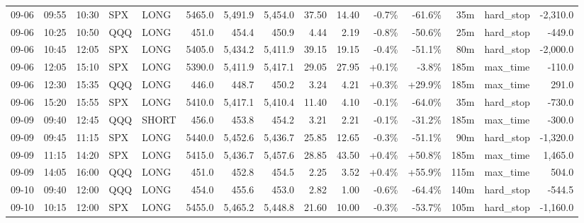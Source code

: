 \documentclass[11pt,a4paper,twoside]{article}
\begin{document}
\begin{landscape}
\begin{center}
\begin{longtable}{>{\color{txtmain}}l l l l l r r r r r r r r >{\color{txtmain}}l r}
09-06 & 09:55 & 10:30 & SPX & LONG & 5465.0 & 5,491.9 & 5,454.0 & 37.50 & 14.40 & \textcolor{lossred}{-0.7\%} & \textcolor{lossred}{-61.6\%} & 35m & hard\_stop & \textcolor{lossred}{-2,310.0} \\
09-06 & 10:25 & 10:50 & QQQ & LONG & 451.0 & 454.4 & 450.9 & 4.44 & 2.19 & \textcolor{lossred}{-0.8\%} & \textcolor{lossred}{-50.6\%} & 25m & hard\_stop & \textcolor{lossred}{-449.0} \\
09-06 & 10:45 & 12:05 & SPX & LONG & 5405.0 & 5,434.2 & 5,411.9 & 39.15 & 19.15 & \textcolor{lossred}{-0.4\%} & \textcolor{lossred}{-51.1\%} & 80m & hard\_stop & \textcolor{lossred}{-2,000.0} \\
09-06 & 12:05 & 15:10 & SPX & LONG & 5390.0 & 5,411.9 & 5,417.1 & 29.05 & 27.95 & \textcolor{wingreen}{+0.1\%} & \textcolor{lossred}{-3.8\%} & 185m & max\_time & \textcolor{lossred}{-110.0} \\
09-06 & 12:30 & 15:35 & QQQ & LONG & 446.0 & 448.7 & 450.2 & 3.24 & 4.21 & \textcolor{wingreen}{+0.3\%} & \textcolor{wingreen}{+29.9\%} & 185m & max\_time & \textcolor{wingreen}{291.0} \\
09-06 & 15:20 & 15:55 & SPX & LONG & 5410.0 & 5,417.1 & 5,410.4 & 11.40 & 4.10 & \textcolor{lossred}{-0.1\%} & \textcolor{lossred}{-64.0\%} & 35m & hard\_stop & \textcolor{lossred}{-730.0} \\
09-09 & 09:40 & 12:45 & QQQ & SHORT & 456.0 & 453.8 & 454.2 & 3.21 & 2.21 & \textcolor{lossred}{-0.1\%} & \textcolor{lossred}{-31.2\%} & 185m & max\_time & \textcolor{lossred}{-300.0} \\
09-09 & 09:45 & 11:15 & SPX & LONG & 5440.0 & 5,452.6 & 5,436.7 & 25.85 & 12.65 & \textcolor{lossred}{-0.3\%} & \textcolor{lossred}{-51.1\%} & 90m & hard\_stop & \textcolor{lossred}{-1,320.0} \\
09-09 & 11:15 & 14:20 & SPX & LONG & 5415.0 & 5,436.7 & 5,457.6 & 28.85 & 43.50 & \textcolor{wingreen}{+0.4\%} & \textcolor{wingreen}{+50.8\%} & 185m & max\_time & \textcolor{wingreen}{1,465.0} \\
09-09 & 14:05 & 16:00 & QQQ & LONG & 451.0 & 452.8 & 454.5 & 2.25 & 3.52 & \textcolor{wingreen}{+0.4\%} & \textcolor{wingreen}{+55.9\%} & 115m & max\_time & \textcolor{wingreen}{504.0} \\
09-10 & 09:40 & 12:00 & QQQ & LONG & 454.0 & 455.6 & 453.0 & 2.82 & 1.00 & \textcolor{lossred}{-0.6\%} & \textcolor{lossred}{-64.4\%} & 140m & hard\_stop & \textcolor{lossred}{-544.5} \\
09-10 & 10:15 & 12:00 & SPX & LONG & 5455.0 & 5,465.2 & 5,448.8 & 21.60 & 10.00 & \textcolor{lossred}{-0.3\%} & \textcolor{lossred}{-53.7\%} & 105m & hard\_stop & \textcolor{lossred}{-1,160.0} \\

\end{longtable}
\end{center}
\end{landscape}
\end{document}
